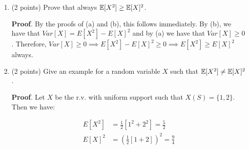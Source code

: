 \documentclass{article}
\begin{document}
\begin{enumerate}
\begin{enumerate}[,label=\alph*.]
\begin{mdbmarginx}{1ex}{0pt}{1ex}{0pt}%
\noindent{}\textbf{Proof}.  We again simply follow the definition of variance. Letting $\mu = E[X]$ constant.%
\end{mdbmarginx}%
\noindent\noindent\[%
\begin{aligned}
Var[X] &= E[(X - \mu)^2] \\
&= E[X^2 - 2X\mu + \mu^2]  \\
&= E[X^2] - 2\mu E[X] + \mu^2 \\
&= E[X^2] - \mu^2 \\
&= E[X^2] - E[X]^2
\end{aligned}
\]%

The first step is just definitional, while the second expand the inner term. Then we use linearity of
expectation in the next step. Next, we take note that $E[X] = \mu$ and subtitute and simplify. Then 
for the final step, we simply reverse substitute $\mu = E[X]$. 
\mdfloatright{\ensuremath{\Box}}%

\item{}
(2 points) Prove that always $\mathbb{E}[X^2] \geq \mathbb{E}[X]^2$.%

\begin{mdbmarginx}{1ex}{0pt}{1ex}{0pt}%
\noindent{}\textbf{Proof}.  By the proofs of (a) and (b), this follows immediately. By (b), we have that $Var[X] = E[X^2] - E[X]^2$ 
and by (a) we have that $Var[X] \geq 0$. Therefore, 
$Var[X] \geq 0 \implies E[X^2] - E[X]^2 \geq 0 \implies E[X^2] \geq E[X]^2$ always.%
\end{mdbmarginx}%

\mdfloatright{\ensuremath{\Box}}%

\item{}
(2 points) Give an example for a random variable $X$ such that $\mathbb{E}[X^2] \neq \mathbb{E}[X]^2$.%

\begin{mdbmarginx}{1ex}{0pt}{1ex}{0pt}%
\noindent{}\textbf{Proof}.  Let $X$ be the r.v. with uniform support such that $X(S) = \{1,2\}$. Then we have:%
\end{mdbmarginx}%
\noindent\noindent\[%
\begin{aligned}
E[X^2] &= \frac{1}{2}[1^2 + 2^2] = \frac{5}{2}\\
E[X]^2 &= (\frac{1}{2}[1 + 2])^2 = \frac{9}{4}
\end{aligned}
\]%


\end{enumerate}
\end{enumerate}
\end{document}
